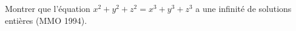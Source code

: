 Montrer que l'équation $x^2 + y^2 + z^2 = x^3 + y^3 + z^3$ a une infinité de solutions entières (MMO 1994).
